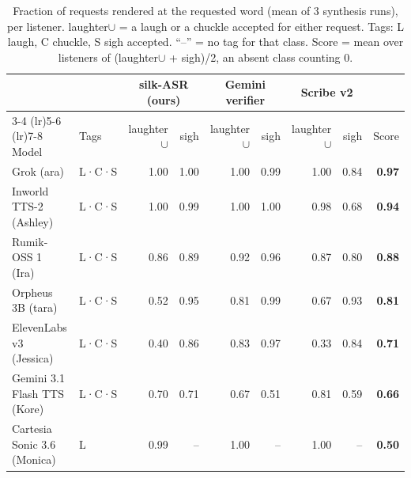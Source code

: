 \begin{table}[t]\centering\small\setlength{\tabcolsep}{5pt}
\begin{tabular}{ll|rr|rr|rr|r}
\toprule
 & & \multicolumn{2}{c|}{silk-ASR (ours)} & \multicolumn{2}{c|}{Gemini verifier} & \multicolumn{2}{c|}{Scribe v2} & \\
\cmidrule(lr){3-4} \cmidrule(lr){5-6} \cmidrule(lr){7-8}
Model & Tags & laughter$\cup$ & sigh & laughter$\cup$ & sigh & laughter$\cup$ & sigh & Score \\
\midrule
Grok (ara) & L·C·S & 1.00 & 1.00 & 1.00 & 0.99 & 1.00 & 0.84 & \textbf{0.97} \\
Inworld TTS-2 (Ashley) & L·C·S & 1.00 & 0.99 & 1.00 & 1.00 & 0.98 & 0.68 & \textbf{0.94} \\
Rumik-OSS 1 (Ira) & L·C·S & 0.86 & 0.89 & 0.92 & 0.96 & 0.87 & 0.80 & \textbf{0.88} \\
Orpheus 3B (tara) & L·C·S & 0.52 & 0.95 & 0.81 & 0.99 & 0.67 & 0.93 & \textbf{0.81} \\
ElevenLabs v3 (Jessica) & L·C·S & 0.40 & 0.86 & 0.83 & 0.97 & 0.33 & 0.84 & \textbf{0.71} \\
Gemini 3.1 Flash TTS (Kore) & L·C·S & 0.70 & 0.71 & 0.67 & 0.51 & 0.81 & 0.59 & \textbf{0.66} \\
Cartesia Sonic 3.6 (Monica) & L & 0.99 & -- & 1.00 & -- & 1.00 & -- & \textbf{0.50} \\
\bottomrule
\end{tabular}
\caption{Fraction of requests rendered at the requested word (mean of 3 synthesis runs), per listener. laughter$\cup$ = a laugh or a chuckle accepted for either request. Tags: L laugh, C chuckle, S sigh accepted. ``--'' = no tag for that class. Score = mean over listeners of (laughter$\cup$ + sigh)/2, an absent class counting 0.}
\label{tab:nova_rendered}
\end{table}
